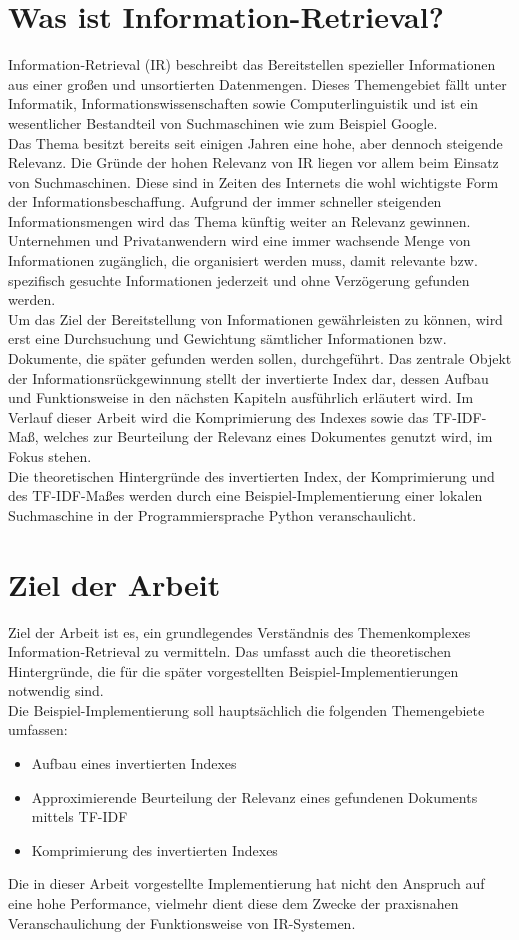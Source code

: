 \section{Was ist Information-Retrieval?}
Information-Retrieval (IR) beschreibt das Bereitstellen spezieller Informationen aus einer großen und unsortierten Datenmengen. Dieses Themengebiet fällt unter Informatik, Informationswissenschaften sowie Computerlinguistik und ist ein wesentlicher Bestandteil von Suchmaschinen wie zum Beispiel Google.
\\
Das Thema besitzt bereits seit einigen Jahren eine hohe, aber dennoch steigende Relevanz. Die Gründe der hohen Relevanz von IR liegen vor allem beim Einsatz von Suchmaschinen. Diese sind in Zeiten des Internets die wohl wichtigste Form der Informationsbeschaffung. Aufgrund der immer schneller steigenden Informationsmengen wird das Thema künftig weiter an Relevanz gewinnen. Unternehmen und Privatanwendern wird eine immer wachsende Menge von Informationen zugänglich, die organisiert werden muss, damit relevante bzw. spezifisch gesuchte Informationen jederzeit und ohne Verzögerung gefunden werden.
\\
Um das Ziel der Bereitstellung von Informationen gewährleisten zu können, wird erst eine Durchsuchung und Gewichtung sämtlicher Informationen bzw. Dokumente, die später gefunden werden sollen, durchgeführt. Das zentrale Objekt der Informationsrückgewinnung stellt der invertierte Index dar, dessen Aufbau und Funktionsweise in den nächsten Kapiteln ausführlich erläutert wird. Im Verlauf dieser Arbeit wird die Komprimierung des Indexes sowie das TF-IDF-Maß, welches zur Beurteilung der Relevanz eines Dokumentes genutzt wird, im Fokus stehen.
\\
Die theoretischen Hintergründe des invertierten Index, der Komprimierung und des TF-IDF-Maßes werden durch eine Beispiel-Implementierung einer lokalen Suchmaschine in der Programmiersprache Python veranschaulicht.

\section{Ziel der Arbeit}
Ziel der Arbeit ist es, ein grundlegendes Verständnis des Themenkomplexes Information-Retrieval zu vermitteln. Das umfasst auch die theoretischen Hintergründe, die für die später vorgestellten Beispiel-Implementierungen notwendig sind.
\\
Die Beispiel-Implementierung soll hauptsächlich die folgenden Themengebiete umfassen:\\
\begin{itemize}
	\item Aufbau eines invertierten Indexes
	\item Approximierende Beurteilung der Relevanz eines gefundenen Dokuments mittels TF-IDF
	\item Komprimierung des invertierten Indexes
\end{itemize}
Die in dieser Arbeit vorgestellte Implementierung hat nicht den Anspruch auf eine hohe Performance, vielmehr dient diese dem Zwecke der praxisnahen Veranschaulichung der Funktionsweise von IR-Systemen.

